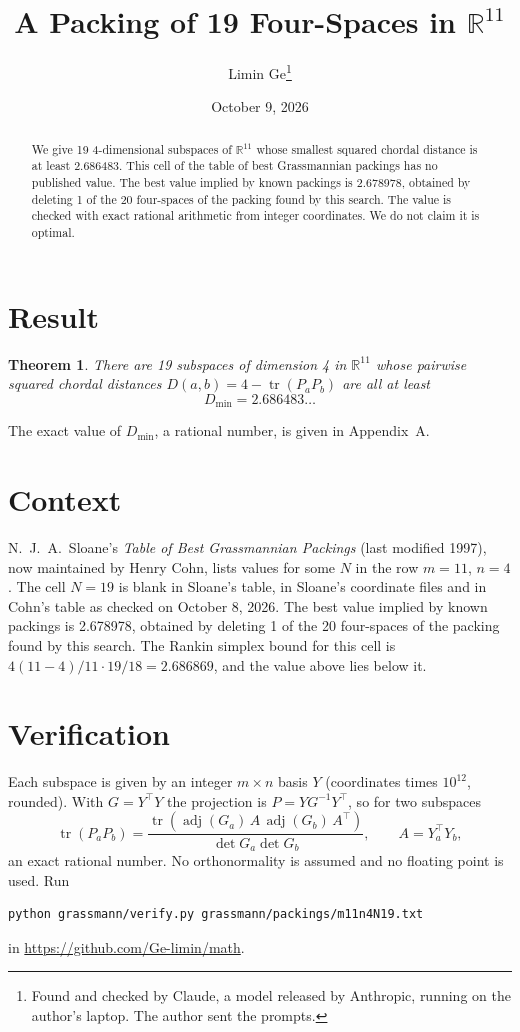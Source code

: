 \documentclass[11pt,a4paper]{article}
\title{A Packing of 19 Four-Spaces in $\mathbb{R}^{11}$}
\author{Limin Ge\thanks{Found and checked by Claude, a model released by Anthropic, running on the author's laptop. The author sent the prompts.}}
\date{October 9, 2026}
\newtheorem*{theorem}{Theorem}
\begin{document}
\maketitle
\begin{abstract}
We give 19 4-dimensional subspaces of $\mathbb{R}^{11}$ whose smallest squared chordal distance is at least 2.686483. This cell of the table of best Grassmannian packings has no published value. The best value implied by known packings is 2.678978, obtained by deleting 1 of the 20 four-spaces of the packing found by this search. The value is checked with exact rational arithmetic from integer coordinates. We do not claim it is optimal.
\end{abstract}

\section{Result}
\begin{theorem}
There are 19 subspaces of dimension 4 in $\mathbb{R}^{11}$ whose pairwise squared chordal distances $D(a,b) = 4 - \operatorname{tr}(P_aP_b)$ are all at least
\[ D_{\min} = 2.686483\ldots \]
\end{theorem}
The exact value of $D_{\min}$, a rational number, is given in Appendix~A.


\section{Context}
N.~J.~A.~Sloane's \emph{Table of Best Grassmannian Packings} (last modified 1997), now maintained by Henry Cohn, lists values for some $N$ in the row $m=11$, $n=4$. The cell $N=19$ is blank in Sloane's table, in Sloane's coordinate files and in Cohn's table as checked on October 8, 2026. The best value implied by known packings is 2.678978, obtained by deleting 1 of the 20 four-spaces of the packing found by this search. The Rankin simplex bound for this cell is $4(11-4)/11\cdot 19/18 = 2.686869$, and the value above lies below it.


\section{Verification}
Each subspace is given by an integer $m\times n$ basis $Y$ (coordinates times $10^{12}$, rounded). With $G=Y^\top Y$ the projection is $P=YG^{-1}Y^\top$, so for two subspaces
\[ \operatorname{tr}(P_aP_b)=\frac{\operatorname{tr}(\operatorname{adj}(G_a)\,A\,\operatorname{adj}(G_b)\,A^\top)}{\det G_a\det G_b},\qquad A=Y_a^\top Y_b, \]
an exact rational number. No orthonormality is assumed and no floating point is used. Run
\begin{verbatim}
python grassmann/verify.py grassmann/packings/m11n4N19.txt
\end{verbatim}
in \url{https://github.com/Ge-limin/math}.
\end{document}
